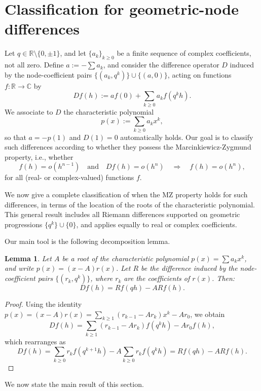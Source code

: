 \documentclass{raex}
\newtheorem{lemma}[theorem]{Lemma}
\theoremstyle{definition}
\begin{document}
 
 


\section{Classification for geometric-node differences}

Let \( q \in \mathbb{R} \setminus \{0, \pm 1\} \), and let \( \{a_k\}_{k \geq 0} \) be a finite sequence of complex coefficients, not all zero. Define \( a := -\sum a_k \), and consider the difference operator \( D \) induced by the node-coefficient pairs \( \{(a_k, q^k)\} \cup \{(a, 0)\} \), acting on functions \( f \colon \mathbb{R} \to \mathbb{C} \) by
\[
Df(h) := a f(0) + \sum_{k \geq 0} a_k f(q^k h).
\]
We associate to \( D \) the characteristic polynomial
\[
p(x) := \sum_{k \geq 0} a_k x^k,
\]
so that \( a = -p(1) \) and \( D(1) = 0 \) automatically holds. Our goal is to classify such differences according to whether they possess the Marcinkiewicz-Zygmund property, i.e., whether
\[
f(h) = o(h^{n-1}) \quad \text{and} \quad Df(h) = o(h^n) \quad \Rightarrow \quad f(h) = o(h^n),
\]
for all (real- or complex-valued) functions \( f \).

We now give a complete classification of when the MZ property holds for such differences, in terms of the location of the roots of the characteristic polynomial. This general result includes all Riemann differences supported on geometric progressions \( \{ q^k \} \cup \{0\} \), and applies equally to real or complex coefficients.

Our main tool is the following decomposition lemma.

\begin{lemma}\label{ll1}
Let \( A \) be a root of the characteristic polynomial \( p(x) = \sum a_k x^k \), and write \( p(x) = (x - A) r(x) \). Let \( R \) be the difference induced by the node-coefficient pairs \( \{(r_k, q^k)\} \), where \( r_k \) are the coefficients of \( r(x) \). Then:
\[
Df(h) = Rf(qh) - A Rf(h).
\]
\end{lemma}

\begin{proof}
Using the identity \( p(x) = (x - A) r(x) = \sum_{k \geq 1} (r_{k-1} - A r_k) x^k - A r_0 \), we obtain
\[
Df(h) = \sum_{k \geq 1} (r_{k-1} - A r_k) f(q^k h) - A r_0 f(h),
\]
which rearranges as
\[
Df(h) = \sum_{k \geq 0} r_k f(q^{k+1} h) - A \sum_{k \geq 0} r_k f(q^k h) = Rf(qh) - A Rf(h).
\]
\end{proof}

We now state the main result of this section.
\end{document}
